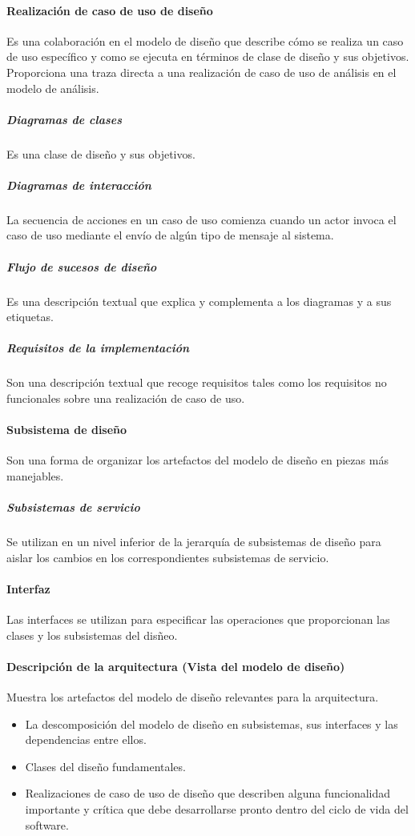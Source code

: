 \paragraph{Realización de caso de uso de diseño}
Es una colaboración en el modelo de diseño que describe cómo se realiza un caso de uso específico y como se ejecuta en términos de clase de diseño y sus objetivos. Proporciona una traza directa a una realización de caso de uso de análisis en el modelo de análisis.
\subparagraph{Diagramas de clases}
Es una clase de diseño y sus objetivos.
\subparagraph{Diagramas de interacción}
La secuencia de acciones en un caso de uso comienza cuando un actor invoca el caso de uso mediante el envío de algún tipo de mensaje al sistema.
\subparagraph{Flujo de sucesos de diseño}
Es una descripción textual que explica y complementa a los diagramas y a sus etiquetas.
\subparagraph{Requisitos de la implementación}
Son una descripción textual que recoge requisitos tales como los requisitos no funcionales sobre una realización de caso de uso.
\paragraph{Subsistema de diseño}
Son una forma de organizar los artefactos del modelo de diseño en piezas más manejables.
\subparagraph{Subsistemas de servicio}
Se utilizan en un nivel inferior de la jerarquía de subsistemas de diseño para aislar los cambios en los correspondientes subsistemas de servicio.
\paragraph{Interfaz}
Las interfaces se utilizan para especificar las operaciones que proporcionan las clases y los subsistemas del disñeo.
\paragraph{Descripción de la arquitectura (Vista del modelo de diseño)}
Muestra los artefactos del modelo de diseño relevantes para la arquitectura.
\begin{itemize}
	\item La descomposición del modelo de diseño en subsistemas, sus interfaces y las dependencias entre ellos.
	\item Clases del diseño fundamentales.
	\item Realizaciones de caso de uso de diseño que describen alguna funcionalidad importante y crítica que debe desarrollarse pronto dentro del ciclo de vida del software.
\end{itemize}
